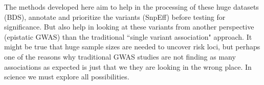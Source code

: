 The methods developed here aim to help in the processing of these huge datasets (BDS), annotate and prioritize the variants (SnpEff) before testing for significance. But also help in looking at these variants from another perspective (epistatic GWAS) than the traditional ``single variant association" approach. It might be true that huge sample sizes are needed to uncover risk loci, but perhaps one of the reasons why traditional GWAS studies are not finding as many associations as expected is just that we they are looking in the wrong place. In science we must explore all possibilities.

